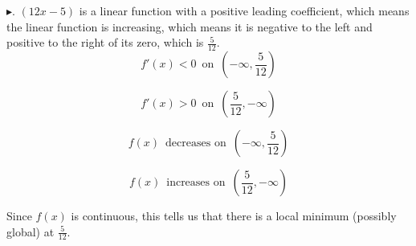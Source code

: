 \documentclass{ximera}
\begin{document}
\begin{example}
$\blacktriangleright$. $(12x - 5)$ is a linear function with a positive leading coefficient, which means the linear function is increasing, which means it is negative to the left and positive to the right of its zero, which is $\frac{5}{12}$. \\



\[
f'(x) < 0 \, \text{ on } \, \left( -\infty, \frac{5}{12} \right)
\]


\[
f'(x) > 0 \, \text{ on } \, \left( \frac{5}{12}, -\infty \right)
\]





\[
f(x)  \, \text{ decreases on } \, \left( -\infty, \frac{5}{12} \right)
\]


\[
f(x)  \, \text{ increases on } \, \left( \frac{5}{12}, -\infty \right)
\]



Since $f(x)$ is continuous, this tells us that there is a local minimum (possibly global) at $\frac{5}{12}$.


\end{example}
\end{document}
